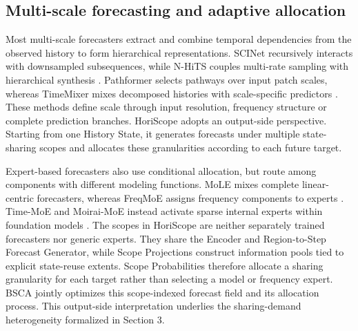 \subsection{Multi-scale forecasting and adaptive allocation}


Most multi-scale forecasters extract and combine temporal dependencies from the observed history to form hierarchical representations. SCINet recursively interacts with downsampled subsequences, while N-HiTS couples multi-rate sampling with hierarchical synthesis \citep{liu2022scinet,challu2023nhits}. Pathformer selects pathways over input patch scales, whereas TimeMixer mixes decomposed histories with scale-specific predictors \citep{chen2024pathformer,wang2024timemixer}. These methods define scale through input resolution, frequency structure or complete prediction branches. HoriScope adopts an output-side perspective. Starting from one History State, it generates forecasts under multiple state-sharing scopes and allocates these granularities according to each future target.

Expert-based forecasters also use conditional allocation, but route among components with different modeling functions. MoLE mixes complete linear-centric forecasters, whereas FreqMoE assigns frequency components to experts \citep{ni2024mole,liu2025freqmoe}. Time-MoE and Moirai-MoE instead activate sparse internal experts within foundation models \citep{shi2025timemoe,liu2025moiraimoe}. The scopes in HoriScope are neither separately trained forecasters nor generic experts. They share the Encoder and Region-to-Step Forecast Generator, while Scope Projections construct information pools tied to explicit state-reuse extents. Scope Probabilities therefore allocate a sharing granularity for each target rather than selecting a model or frequency expert. BSCA jointly optimizes this scope-indexed forecast field and its allocation process. This output-side interpretation underlies the sharing-demand heterogeneity formalized in Section 3.
